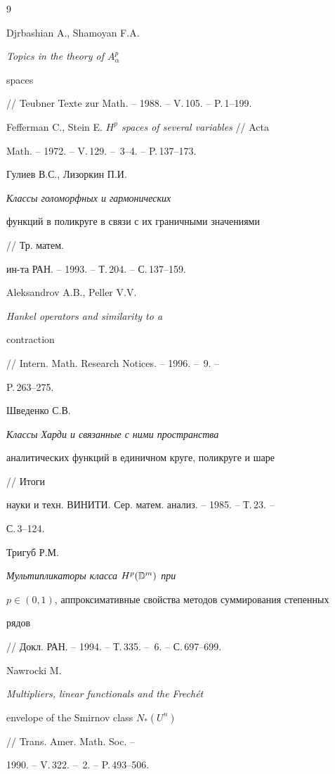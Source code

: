 \begin{thebibliography}{9} 


 




Djrbashian A., Shamoyan F.A. {\em Topics in the theory of $A^p_\alpha$ 


spaces} // Teubner Texte zur Math. -- 1988. -- V.\,105. -- P.\,1--199.




Fefferman C., Stein E. {\em $H^p$ spaces of several variables} // Acta 


Math. -- 1972. -- V.\,129. -- \No\,3--4. -- P.\,137--173. 




Гулиев В.С., Лизоркин П.И. {\em Классы голоморфных и гармонических 


функций в поликруге в связи с их граничными значениями} // Тр. матем. 


ин-та РАН. -- 1993. -- Т.\,204. -- С.\,137--159. 




Aleksandrov A.B., Peller V.V. {\em Hankel operators and similarity to a 


contraction} // Intern. Math. Research Notices. -- 1996. -- \No\,9. -- 


P.\,263--275. 




Шведенко С.В. {\em Классы Харди и связанные с ними пространства 


аналитических функций в единичном круге, поликруге и шаре} // Итоги 


науки и техн. ВИНИТИ. Сер. матем. анализ. -- 1985. -- Т.\,23. -- 


С.\,3--124. 




Тригуб Р.М. {\em Мультипликаторы класса $H^p(\Bbb D^m)$ при 


$p\in(0,1)$, аппроксимативные свойства методов суммирования степенных 


рядов} // Докл. РАН. -- 1994. -- Т.\,335. -- \No\,6. -- С.\,697--699. 




Nawrocki M. {\em Multipliers, linear functionals and the Frech\'et 


envelope of the Smirnov class $N_*(U^n)$} // Trans. Amer. Math. Soc. -- 


1990. -- V.\,322. -- \No\,2. -- P.\,493--506. 


 


\end{thebibliography} 


 


\vskip 2cm 


 






 


\label{end} 


 


 


